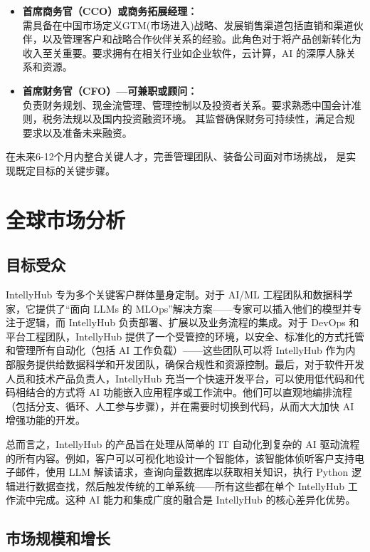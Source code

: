 \documentclass[11点, A4纸, 单面]{article}
\begin{document}
\begin{itemize}
    \item \textbf{首席商务官（CCO）或商务拓展经理：} \\
    需具备在中国市场定义GTM(市场进入)战略、发展销售渠道包括直销和渠道伙伴，以及管理客户和战略合作伙伴关系的经验。此角色对于将产品创新转化为收入至关重要。要求拥有在相关行业如企业软件，云计算，AI 的深厚人脉关系和资源。

    \item \textbf{首席财务官（CFO）—可兼职或顾问：} \\
    负责财务规划、现金流管理、管理控制以及投资者关系。要求熟悉中国会计准则，税务法规以及国内投资融资环境。 其监督确保财务可持续性，满足合规要求以及准备未来融资。
\end{itemize}

在未来6-12个月内整合关键人才，完善管理团队、装备公司面对市场挑战， 是实现既定目标的关键步骤。

\section{全球市场分析}
\subsection{目标受众}

IntellyHub 专为多个关键客户群体量身定制。对于 AI/ML 工程团队和数据科学家，它提供了“面向 LLMs 的 MLOps”解决方案——专家可以插入他们的模型并专注于逻辑，而 IntellyHub 负责部署、扩展以及业务流程的集成。对于 DevOps 和平台工程团队，IntellyHub 提供了一个受管控的环境，以安全、标准化的方式托管和管理所有自动化（包括 AI 工作负载）——这些团队可以将 IntellyHub 作为内部服务提供给数据科学和开发团队，确保合规性和资源控制。最后，对于软件开发人员和技术产品负责人，IntellyHub 充当一个快速开发平台，可以使用低代码和代码相结合的方式将 AI 功能嵌入应用程序或工作流中。他们可以直观地编排流程（包括分支、循环、人工参与步骤），并在需要时切换到代码，从而大大加快 AI 增强功能的开发。


总而言之，IntellyHub 的产品旨在处理从简单的 IT 自动化到复杂的 AI 驱动流程的所有内容。例如，客户可以可视化地设计一个智能体，该智能体侦听客户支持电子邮件，使用 LLM 解读请求，查询向量数据库以获取相关知识，执行 Python 逻辑进行数据查找，然后触发传统的工单系统——所有这些都在单个 IntellyHub 工作流中完成。这种 AI 能力和集成广度的融合是 IntellyHub 的核心差异化优势。

\subsection{市场规模和增长}
\end{document}
